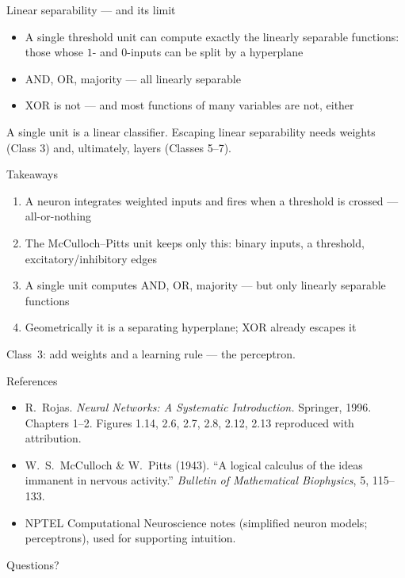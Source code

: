 \documentclass[aspectratio=169, 11pt]{beamer}
\newcommand{\src}[3]{}      %
\newcommand{\nosrc}{}       %
\begin{document}
\begin{frame}{Linear separability --- and its limit}
  \src{rojas1996}{section}{3.3.1}
  \begin{itemize}
    \item A single threshold unit can compute exactly the
          \alert{linearly separable} functions: those whose
          $1$- and $0$-inputs can be split by a hyperplane
    \item AND, OR, majority --- all linearly separable
    \item XOR is not --- and most functions of many variables
          are not, either
  \end{itemize}
  \vspace{0.3em}
  \begin{redhighlight}
    A single unit is a linear classifier. Escaping
    linear separability needs \alert{weights} (Class 3) and,
    ultimately, \alert{layers} (Classes 5--7).
  \end{redhighlight}
\end{frame}

\begin{frame}{Takeaways}
  \nosrc
  \begin{enumerate}\setlength{\itemsep}{2pt}
    \item A neuron integrates weighted inputs and fires when a
          \alert{threshold} is crossed --- all-or-nothing
    \item The \alert{McCulloch--Pitts unit} keeps only this:
          binary inputs, a threshold, excitatory/inhibitory
          edges
    \item A single unit computes AND, OR, majority --- but
          only \alert{linearly separable} functions
    \item Geometrically it is a \alert{separating hyperplane};
          XOR already escapes it
  \end{enumerate}
  \vspace{0.3em}
  \begin{redhighlight}
    Class~3: add \alert{weights} and a \alert{learning rule}
    --- the perceptron.
  \end{redhighlight}
\end{frame}

\begin{frame}{References}
  \nosrc
  \footnotesize
  \begin{itemize}
    \item R.~Rojas. \textit{Neural Networks: A Systematic
          Introduction.} Springer, 1996. Chapters 1--2.
          Figures 1.14, 2.6, 2.7, 2.8, 2.12, 2.13 reproduced
          with attribution.
    \item W.~S.~McCulloch \& W.~Pitts (1943). ``A logical
          calculus of the ideas immanent in nervous
          activity.'' \textit{Bulletin of Mathematical
          Biophysics}, 5, 115--133.
    \item NPTEL Computational Neuroscience notes (simplified
          neuron models; perceptrons), used for supporting
          intuition.
  \end{itemize}
\end{frame}

\begin{frame}[standout]
  \nosrc
  Questions?
\end{frame}
\end{document}
